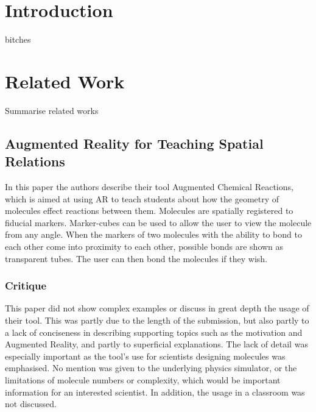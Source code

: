 \maketitle
\IEEEdisplaynotcompsoctitleabstractindextext
\IEEEpeerreviewmaketitle
\section{Introduction}

 bitches 

\section{Related Work}
Summarise related works
\subsection{Augmented Reality for Teaching Spatial Relations}
In this paper\cite{Maier09} the authors describe their tool Augmented Chemical Reactions, which is aimed at using AR to teach students about how the geometry of molecules effect reactions between them. Molecules are spatially registered to fiducial markers. Marker-cubes can be used to allow the user to view the molecule from any angle. When the markers of two molecules with the ability to bond to each other come into proximity to each other, possible bonds are shown as transparent tubes. The user can then bond the molecules if they wish.

\subsubsection{Critique}
This paper did not show complex examples or discuss in great depth the usage of their tool. This was partly due to the length of the submission, but also partly to a lack of conciseness in describing supporting topics such as the motivation and Augmented Reality, and partly to superficial explanations. The lack of detail was especially important as the tool's use for scientists designing molecules was emphasised. No mention was given to the underlying physics simulator, or the limitations of molecule numbers or complexity, which would be important information for an interested scientist. In addition, the usage in a classroom was not discussed.

